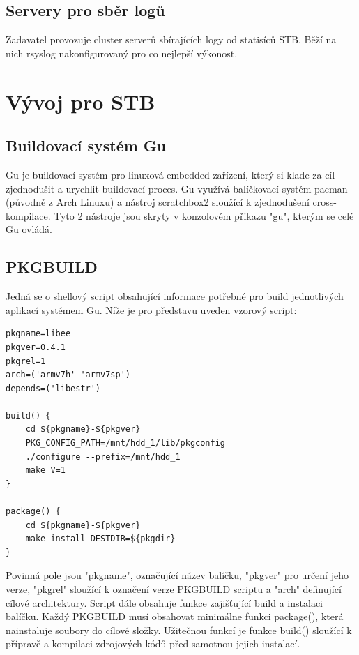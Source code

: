 \documentclass[thesis=B,czech]{FITthesis}[2012/06/26]
\begin{document}
\subsection{Servery pro sběr logů}
Zadavatel provozuje cluster serverů sbírajících logy od statisíců STB. Běží na nich rsyslog nakonfigurovaný pro co nejlepší výkonost.


\section{Vývoj pro STB}
\subsection{Buildovací systém Gu}
Gu je buildovací systém pro linuxová embedded zařízení, který si klade za cíl zjednodušit a urychlit buildovací proces. Gu využívá balíčkovací systém pacman (původně z Arch Linuxu) a nástroj scratchbox2 sloužící k zjednodušení cross-kompilace. Tyto 2 nástroje jsou skryty v konzolovém přikazu "gu", kterým se celé Gu ovládá.

\subsection{PKGBUILD}
Jedná se o shellový script obsahující informace potřebné pro build jednotlivých aplikací systémem Gu. Níže je pro představu uveden vzorový script:
\begin{scriptsize}
\begin{verbatim}
pkgname=libee
pkgver=0.4.1
pkgrel=1
arch=('armv7h' 'armv7sp')
depends=('libestr')

build() {
    cd ${pkgname}-${pkgver}
    PKG_CONFIG_PATH=/mnt/hdd_1/lib/pkgconfig
    ./configure --prefix=/mnt/hdd_1
    make V=1
}

package() {
    cd ${pkgname}-${pkgver}
    make install DESTDIR=${pkgdir}
}
\end{verbatim}
\end{scriptsize}

Povinná pole jsou "pkgname", označující název balíčku, "pkgver" pro určení jeho verze, "pkgrel" sloužící k označení verze PKGBUILD scriptu a "arch" definující cílové architektury.
 Script dále obsahuje funkce zajišťující build a instalaci balíčku. Každý PKGBUILD musí obsahovat minimálne funkci package(), která nainstaluje soubory do cílové složky. Užitečnou funkcí je funkce build() sloužící k přípravě a kompilaci zdrojových kódů před samotnou jejich instalací.
\end{document}
